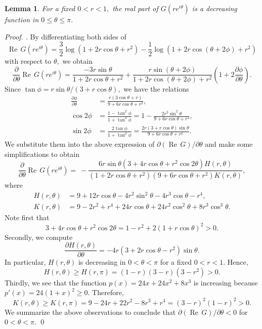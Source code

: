 \documentclass[a4paper,12pt]{amsart}
\numberwithin{equation}{section}
\newtheorem{lem}[thm]{Lemma}
\theoremstyle{definition}
\newenvironment{pf}[1][]{ \vskip 3mm
 \noindent
 \ifthenelse{\equal{#1}{}}  {{\slshape Proof. }}  {{\slshape #1.} } }{\qed\bigskip}
\begin{document}
\begin{lem}\label{lem:Re}
For a fixed $0<r<1,$ the real part of $G(re^{i\theta})$
is a decreasing function in $0\le\theta\le\pi.$
\end{lem}

\begin{pf}
By differentiating both sides of
$$
{{\operatorname{Re}\,}} G(re^{i\theta})
=\frac32\log(1+2r\cos\theta+r^2)
-\frac12\log(1+2r\cos(\theta+2\phi)+r^2)
$$
with respect to $\theta,$ we obtain
$$
\frac{\partial}{\partial\theta}{{\operatorname{Re}\,}} G(re^{i\theta})
=\frac{-3r\sin\theta}{1+2r\cos\theta+r^2}
+\frac{r\sin(\theta+2\phi)}{1+2r\cos(\theta+2\phi)+r^2}
\left(1+2\frac{\partial\phi}{\partial\theta}\right).
$$
Since $\tan\phi=r\sin\theta/(3+r\cos\theta),$ we have the relations
\begin{align*}
\frac{\partial\phi}{\partial\theta}
&=\frac{r(3\cos\theta+r)}{9+6r\cos\theta+r^2}, \\
\cos 2\phi&=\frac{1-\tan^2\phi}{1+\tan^2\phi}
=1-\frac{2r^2\sin^2\theta}{9+6r\cos\theta+r^2}, \\
\sin 2\phi&=\frac{2\tan\phi}{1+\tan^2\phi}
=\frac{2r(3+r\cos\theta)\sin\theta}{9+6r\cos\theta+r^2}.
\end{align*}
We substitute them into the above expression of
$\partial({{\operatorname{Re}\,}} G)/\partial\theta$
and make some simplifications to obtain
$$
\frac{\partial}{\partial\theta}{{\operatorname{Re}\,}} G(re^{i\theta})
=~-\frac{6r\sin\theta(3+4r\cos\theta+r^2\cos2\theta)H(r,\theta)}
{(1+2r\cos\theta+r^2)(9+6r\cos\theta+r^2)K(r,\theta)},
$$
where
\begin{align*}
H(r,\theta)&=9+12r\cos\theta-4r^2\sin^2\theta-4r^3\cos\theta-r^4, \\
K(r,\theta)&=9-2r^2+r^4+24r\cos\theta+24r^2\cos^2\theta+8r^3\cos^3\theta.
\end{align*}
Note first that
$$
3+4r\cos\theta+r^2\cos2\theta=1-r^2+2(1+r\cos\theta)^2>0.
$$
Secondly, we compute
$$
\frac{\partial H(r,\theta)}{\partial\theta}
=-4r(3+2r\cos\theta-r^2)\sin\theta.
$$
In particular, $H(r,\theta)$ is decreasing in $0<\theta<\pi$
for a fixed $0<r<1.$
Hence,
$$
H(r,\theta)\ge H(r,\pi)=(1-r)(3-r)(3-r^2)>0.
$$
Thirdly, we see that the function $p(x)=24x+24x^2+8x^3$ is increasing
because $p'(x)=24(1+x)^2\ge0.$
Therefore,
$$
K(r,\theta)\ge K(r,\pi)=9-24r+22r^2-8r^3+r^4=(3-r)^2(1-r)^2>0.
$$
We summarize the above observations to conclude
that $\partial({{\operatorname{Re}\,}} G)/\partial\theta<0$ for $0<\theta<\pi.$
\end{pf}
\end{document}

